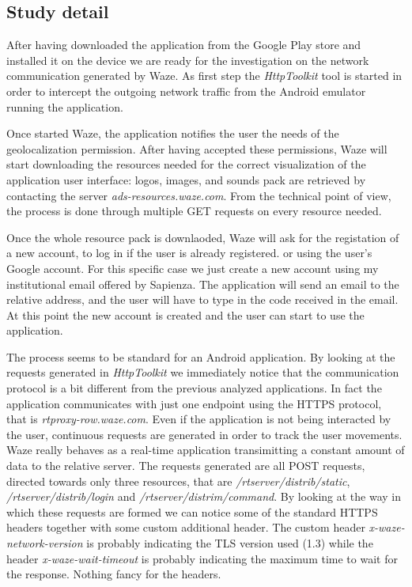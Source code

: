	\subsection{Study detail}
		\par After having downloaded the application from the Google Play store and installed it on the device we are ready for the investigation on the network communication generated by Waze. \newline
		As first step the \textit{HttpToolkit} tool is started in order to intercept the outgoing network traffic from the Android emulator running the application. \newline
		\par Once started Waze, the application notifies the user the needs of the geolocalization permission. After having accepted these permissions, Waze will start downloading the resources needed for the correct visualization of the application user interface: logos, images, and sounds pack are retrieved by contacting the server \textit{ads-resources.waze.com}. From the technical point of view, the process is done through multiple GET requests on every resource needed. \newline
		\par Once the whole resource pack is downlaoded, Waze will ask for the registation of a new account, to log in if the user is already registered. or using the user's Google account. For this specific case we just create a new account using my  institutional email offered by Sapienza. The application will send an email to the relative address, and the user will have to type in the code received in the email. At this point the new account is created and the user can start to use the application. \newline
		\par The process seems to be standard for an Android application. By looking at the requests generated in \textit{HttpToolkit} we immediately notice that the communication protocol is a bit different from the previous analyzed applications. In fact the application communicates with just one endpoint using the HTTPS protocol, that is \textit{rtproxy-row.waze.com}. Even if the application is not being interacted by the user, continuous requests are generated in order to track the user movements. Waze really behaves as a real-time application transimitting a constant amount of data to the relative server. \newline
		The requests generated are all POST requests, directed towards only three resources, that are \textit{/rtserver/distrib/static}, \textit{/rtserver/distrib/login} and \textit{/rtserver/distrim/command}. By looking at the way in which these requests are formed we can notice some of the standard HTTPS headers together with some custom additional header. The custom header \textit{x-waze-network-version} is probably indicating the TLS version used (1.3) while the header \textit{x-waze-wait-timeout} is probably indicating the maximum time to wait for the response. Nothing fancy for the headers.\newline
